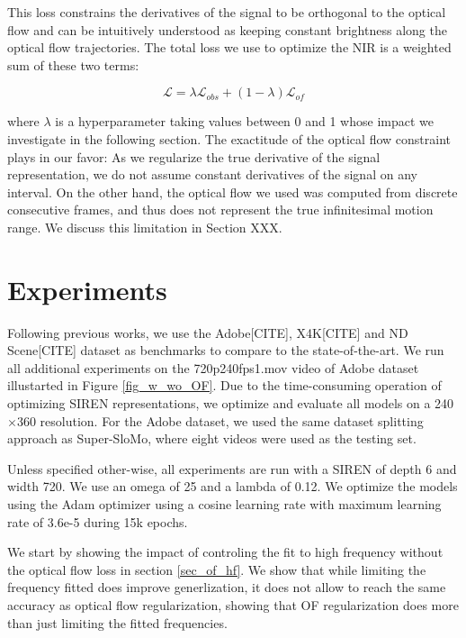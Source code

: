 \documentclass{article}
\begin{document}
This loss constrains the derivatives of the signal to be orthogonal to the optical flow and
can be intuitively understood as keeping constant brightness along the optical flow trajectories.
The total loss we use to optimize the NIR is a weighted sum of these two terms:

\begin{equation}
\mathcal{L} = \lambda \mathcal{L}_{obs} + (1-\lambda) \mathcal{L}_{of}
\end{equation}

where $\lambda$ is a hyperparameter taking values between 0 and 1 whose impact we investigate in the following section.
The exactitude of the optical flow constraint plays in our favor:
As we regularize the true derivative of the signal representation, we do not assume constant derivatives of the signal on any interval.
On the other hand, the optical flow we used was computed from discrete consecutive frames,
and thus does not represent the true infinitesimal motion range.
We discuss this limitation in Section XXX.

\section{Experiments}

Following previous works, we use the Adobe[CITE], X4K[CITE] and ND Scene[CITE] dataset as benchmarks to compare to the state-of-the-art.
We run all additional experiments on the 720p240fps1.mov video of Adobe dataset illustarted in Figure \ref{fig_w_wo_OF}.
Due to the time-consuming operation of optimizing SIREN representations, we optimize and evaluate all models on a 240$\times$360 resolution.
For the Adobe dataset, we used the same dataset splitting approach as Super-SloMo, where eight videos were used as the testing set.

Unless specified other-wise, all experiments are run with a SIREN of depth 6 and width 720.
We use an omega of 25 and a lambda of 0.12.
We optimize the models using the Adam optimizer using a cosine learning rate with maximum learning rate of 3.6e-5 during 15k epochs.

We start by showing the impact of controling the fit to high frequency without the optical flow loss in section \ref{sec_of_hf}.
We show that while limiting the frequency fitted does improve generlization, it does not allow to reach
the same accuracy as optical flow regularization, showing that OF regularization does more than just limiting the fitted frequencies.
\end{document}
